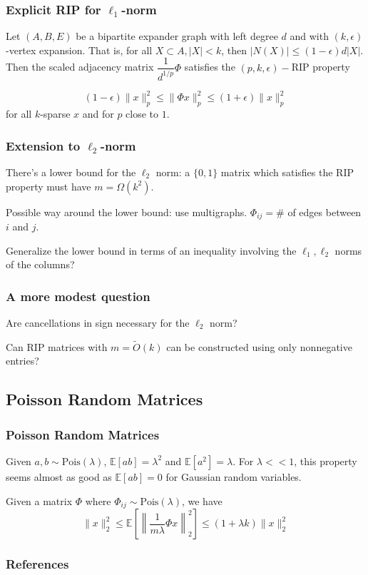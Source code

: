 \documentclass[aspectratio=34]{beamer}
\theoremstyle{plain}
\begin{document}
\begin{frame}
    \frametitle{Explicit RIP for $\ell_1$-norm}
    \begin{theorem}
    Let $(A,B,E)$ be a bipartite expander graph with left degree $d$ and with $(k,\epsilon)$-vertex expansion. That is, for all $X \subset A, |X| < k$, then $|N(X)| \le (1-\epsilon)d|X|$. Then the scaled adjacency matrix $\dfrac{1}{d^{1/p}}\Phi$ satisfies the $(p,k,\epsilon)-$RIP property
    
    \[(1-\epsilon)\|x\|_p^2 \le \|\Phi x\|_p^2 \le (1+\epsilon)\|x\|_p^2\]
    for all $k$-sparse $x$ and for $p$ close to $1$. 
	
    \end{theorem}	

\end{frame}

\begin{frame}
\frametitle{Extension to $\ell_2$-norm}
There's a lower bound for the $\ell_2$ norm: a $\{0,1\}$ matrix which satisfies the RIP property must have $m = \Omega(k^2)$. 

Possible way around the lower bound: use multigraphs. $\Phi_{ij} = \#$ of edges between $i$ and $j$. 

Generalize the lower bound in terms of an inequality involving the $\ell_1,\ell_2$ norms of the columns?

\end{frame}

%
\begin{frame}
\frametitle{A more modest question}
Are cancellations in sign necessary for the $\ell_2$ norm?

Can RIP matrices with $m = \tilde{O}(k)$ can be constructed using only nonnegative entries?
 
\end{frame}

\subsection{Poisson Random Matrices}
\begin{frame}
    \frametitle{Poisson Random Matrices}
    Given $a,b \sim \text{Pois}(\lambda)$, $\mathbb{E}[ab] = \lambda^2$ and $\mathbb{E}[a^2] = \lambda$.
    For $\lambda << 1$, this property seems almost as good as $\mathbb{E}[ab] = 0$ for Gaussian random variables. 
    
    \begin{Lemma}
    	
    Given a matrix $\Phi$ where $\Phi_{ij} \sim \text{Pois}(\lambda)$, we have
    \[\|x\|_2^2 \le \mathbb{E}\left[\left\|\frac{1}{m\lambda}\Phi x\right\|_2^2\right] \le (1+\lambda k)\|x\|_2^2\]	
    \end{Lemma}

\end{frame}

\begin{frame}[t,allowframebreaks]{}
\frametitle{References}



\end{frame}
\end{document}
